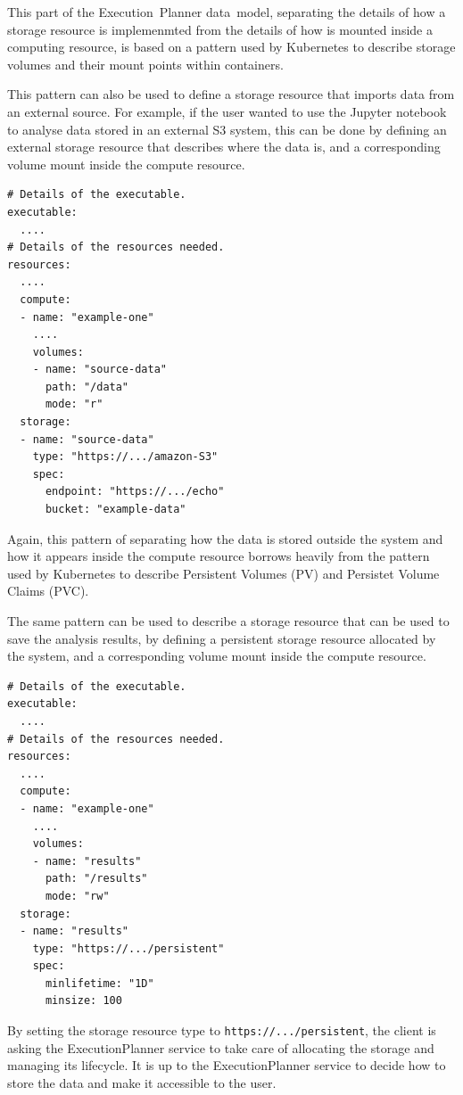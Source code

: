 \documentclass[11pt,a4paper]{ivoa}
\newcommand{\datamodel} {data~model}
\newcommand{\execplanner} {ExecutionPlanner}
\newcommand{\executionplanner} {Execution~Planner}
\newcommand{\jupyternotebook} {Jupyter notebook}
\newcommand{\kubernetes} {Kubernetes}
\newcommand{\codeword}[1] {\texttt{#1}}
\begin{document}
This part of the \executionplanner{} \datamodel{}, separating the details of how
a storage resource is implemenmted from the details of how is mounted inside a
computing resource, is based on a pattern used by \kubernetes{} to describe storage
volumes and their mount points within containers.

This pattern can also be used to define a storage resource that imports data from
an external source.
For example, if the user wanted to use the \jupyternotebook{} to analyse data stored
in an external S3 system, this can be done by defining an external storage resource
that describes where the data is,
and a corresponding volume mount inside the compute resource.

\begin{lstlisting}[]
# Details of the executable.
executable:
  ....
# Details of the resources needed.
resources:
  ....
  compute:
  - name: "example-one"
    ....
    volumes:
    - name: "source-data"
      path: "/data"
      mode: "r"
  storage:
  - name: "source-data"
    type: "https://.../amazon-S3"
    spec:
      endpoint: "https://.../echo"
      bucket: "example-data"
\end{lstlisting}

Again, this pattern of separating how the data is stored outside the system
and how it appears inside the compute resource borrows heavily from the
pattern used by \kubernetes{} to describe Persistent Volumes (PV) and
Persistet Volume Claims (PVC).

The same pattern can be used to describe a storage resource that can be used
to save the analysis results, by defining a persistent storage resource
allocated by the system, and a corresponding volume mount inside the compute resource.

\begin{lstlisting}[]
# Details of the executable.
executable:
  ....
# Details of the resources needed.
resources:
  ....
  compute:
  - name: "example-one"
    ....
    volumes:
    - name: "results"
      path: "/results"
      mode: "rw"
  storage:
  - name: "results"
    type: "https://.../persistent"
    spec:
      minlifetime: "1D"
      minsize: 100
\end{lstlisting}

By setting the storage resource type to \codeword{https://.../persistent},
the client is asking the \execplanner{} service to take care of allocating
the storage and managing its lifecycle.
It is up to the \execplanner{} service to decide how to store the data and
make it accessible to the user.
\end{document}
